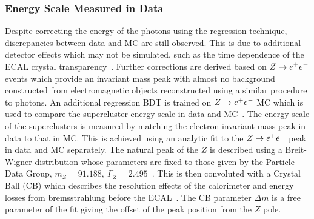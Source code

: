 \subsubsection{Energy Scale Measured in Data}
Despite correcting the energy of the photons using the regression technique, discrepancies between data and
MC are still observed. This is due to additional detector effects which may not be simulated, such as the
time dependence of the ECAL crystal transparency~\citep{CMS-DP-2012-007}. Further corrections are
derived based on $Z\rightarrow e^{+}e^{-}$ events which provide an invariant mass peak with almost no background constructed from 
electromagnetic objects reconstructed using a similar procedure to photons.
An additional regression BDT is trained on $Z\rightarrow e^{+}e^{-}$ MC which is used
to compare the supercluster energy scale in data and MC~\citep{AN-12-048}.
The energy scale of the superclusters is measured by matching the electron
invariant mass peak in data to that in MC. This is achieved using an analytic fit to the $Z\rightarrow e^{+}e^{-}$ peak in data and MC
separately. The natural peak of the $Z$ is described using a Breit-Wigner distribution whose parameters are fixed
to those given by the Particle Data Group, $m_{Z}=91.188,~\Gamma_{Z} = 2.495$~\citep{pdg}. This is then convoluted 
with a Crystal Ball (CB) which describes the resolution effects of the calorimeter and energy losses from 
bremsstrahlung before the ECAL~\citep{crystalball}. 
The CB parameter $\Delta m$ is a free parameter of the fit giving the 
offset of the peak position from the $Z$ pole. 

